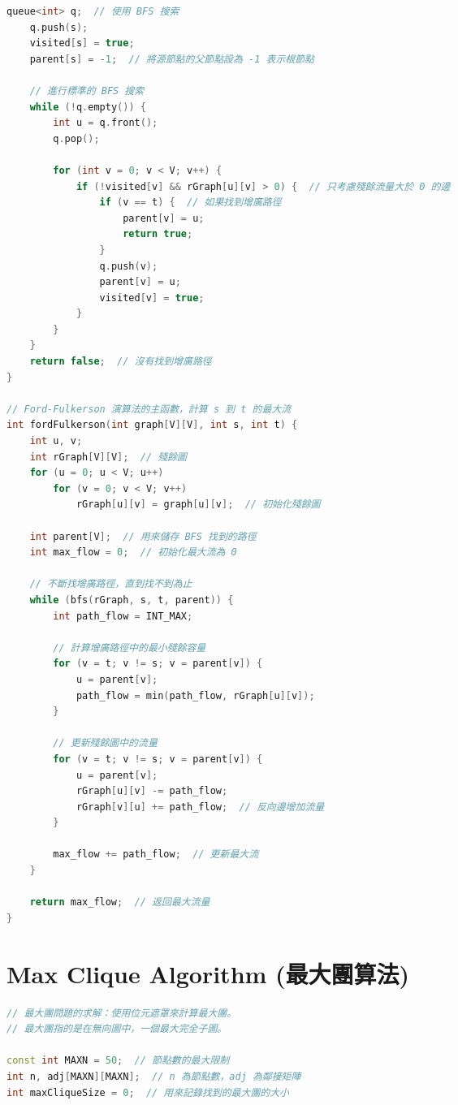 \documentclass{article}
\begin{document}
\begin{multicols}{2}
\begin{lstlisting}[language=C++]
    queue<int> q;  // 使用 BFS 搜索
    q.push(s);
    visited[s] = true;
    parent[s] = -1;  // 將源節點的父節點設為 -1 表示根節點

    // 進行標準的 BFS 搜索
    while (!q.empty()) {
        int u = q.front();
        q.pop();

        for (int v = 0; v < V; v++) {
            if (!visited[v] && rGraph[u][v] > 0) {  // 只考慮殘餘流量大於 0 的邊
                if (v == t) {  // 如果找到增廣路徑
                    parent[v] = u;
                    return true;
                }
                q.push(v);
                parent[v] = u;
                visited[v] = true;
            }
        }
    }
    return false;  // 沒有找到增廣路徑
}

// Ford-Fulkerson 演算法的主函數，計算 s 到 t 的最大流
int fordFulkerson(int graph[V][V], int s, int t) {
    int u, v;
    int rGraph[V][V];  // 殘餘圖
    for (u = 0; u < V; u++)
        for (v = 0; v < V; v++)
            rGraph[u][v] = graph[u][v];  // 初始化殘餘圖

    int parent[V];  // 用來儲存 BFS 找到的路徑
    int max_flow = 0;  // 初始化最大流為 0

    // 不斷找增廣路徑，直到找不到為止
    while (bfs(rGraph, s, t, parent)) {
        int path_flow = INT_MAX;

        // 計算增廣路徑中的最小殘餘容量
        for (v = t; v != s; v = parent[v]) {
            u = parent[v];
            path_flow = min(path_flow, rGraph[u][v]);
        }

        // 更新殘餘圖中的流量
        for (v = t; v != s; v = parent[v]) {
            u = parent[v];
            rGraph[u][v] -= path_flow;
            rGraph[v][u] += path_flow;  // 反向邊增加流量
        }

        max_flow += path_flow;  // 更新最大流
    }

    return max_flow;  // 返回最大流量
}
\end{lstlisting}

\section{Max Clique Algorithm (最大團算法)}

\begin{lstlisting}[language=C++]
// 最大團問題的求解：使用位元遮罩來計算最大團。
// 最大團指的是在無向圖中，一個最大完全子圖。

const int MAXN = 50;  // 節點數的最大限制
int n, adj[MAXN][MAXN];  // n 為節點數，adj 為鄰接矩陣
int maxCliqueSize = 0;  // 用來記錄找到的最大團的大小


\end{lstlisting}
\end{multicols}
\end{document}
